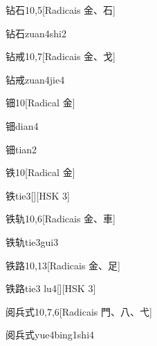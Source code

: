 \begin{entry}{钻石}{10,5}[Radicais ⾦、⽯]
  \begin{phonetics}{钻石}{zuan4shi2}
  \end{phonetics}
\end{entry}

\begin{entry}{钻戒}{10,7}[Radicais ⾦、⼽]
  \begin{phonetics}{钻戒}{zuan4jie4}
  \end{phonetics}
\end{entry}

\begin{entry}{钿}{10}[Radical ⾦]
  \begin{phonetics}{钿}{dian4}
  \end{phonetics}
  \begin{phonetics}{钿}{tian2}
  \end{phonetics}
\end{entry}

\begin{entry}{铁}{10}[Radical ⾦]
  \begin{phonetics}{铁}{tie3}[][HSK 3]
  \end{phonetics}
\end{entry}

\begin{entry}{铁轨}{10,6}[Radicais ⾦、⾞]
  \begin{phonetics}{铁轨}{tie3gui3}
  \end{phonetics}
\end{entry}

\begin{entry}{铁路}{10,13}[Radicais ⾦、⾜]
  \begin{phonetics}{铁路}{tie3 lu4}[][HSK 3]
  \end{phonetics}
\end{entry}

\begin{entry}{阅兵式}{10,7,6}[Radicais ⾨、⼋、⼷]
  \begin{phonetics}{阅兵式}{yue4bing1shi4}
  \end{phonetics}
\end{entry}

